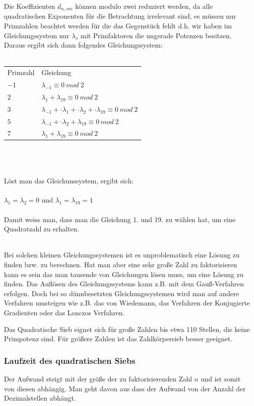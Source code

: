 \documentclass[10pt, bigheadings]{scrartcl}
\begin{document}
Die Koeffizienten $d_{n,sm}$ können modulo zwei reduziert
werden, da alle quadratischen Exponenten für die Betrachtung
irrelevant sind, es müssen nur Primzahlen beachtet
werden für die das Gegenstück fehlt d.h. wir haben
im Gleichungssystem nur $\lambda_s$ mit Primfaktoren
die ungerade Potenzen besitzen. Daraus ergibt
sich dann folgendes Gleichungssystem:\\\\
{\it
\begin{tabular}{ll}
Primzahl & Gleichung\\
$-1$ & $ \lambda_{-1} \equiv 0\ mod\ 2  $\\
$2$ & $\lambda_{1} + \lambda_{19} \equiv 0\ mod\ 2  $\\
$3$ & $\lambda_{-1} + \cdot \lambda_{1} + \cdot \lambda_{2} +  \cdot \lambda_{19} \equiv 0\ mod\ 2  $\\
$5$ & $ \lambda_{-1} + \cdot \lambda_{2} + \lambda_{19} \equiv 0\ mod\ 2  $\\
$7$ & $\lambda_{1} + \lambda_{19} \equiv 0\ mod\ 2  $\\
\end{tabular}\\\\\\
Löst man das Gleichunssystem, ergibt sich:\\\\
$\lambda_1 = \lambda_2 = 0 $ und $\lambda_1 = \lambda_{19} = 1 $\\\\
Damit weiss man, dass man die Gleichung 1. und 19. zu wählen hat, um eine Quadratzahl zu erhalten.\\\\
}

Bei solchen kleinen Gleichungssystemen ist es unproblematisch eine
Lösung zu finden bzw. zu berechnen. Hat man aber eine sehr
große Zahl zu faktorisieren kann es sein das man tausende
von Gleichungen lösen muss, um eine Lösung zu finden. Das
Auflösen des Gleichungssystems kann z.B. mit dem Gauß-Verfahren
erfolgen. Doch bei so dünnbesetzten Gleichungssystemen wird
man auf andere Verfahren umsteigen wie z.B. das von Wiedemann,
das Verfahren der Konjugierte Gradienten oder das Lanczos Verfahren.

Das Quadratische Sieb eignet sich für große Zahlen bis etwa
110 Stellen, die keine Primpotenz sind. Für größere Zahlen ist
das Zahlkörpersieb besser geeignet.

\subsubsection*{Laufzeit des quadratischen Siebs}
Der Aufwand steigt mit der größe der zu faktorisierenden Zahl
$n$ und ist somit von diesen abhängig. Man geht davon aus dass
der Aufwand von der Anzahl der Dezimalstellen abhängt.
\end{document}
